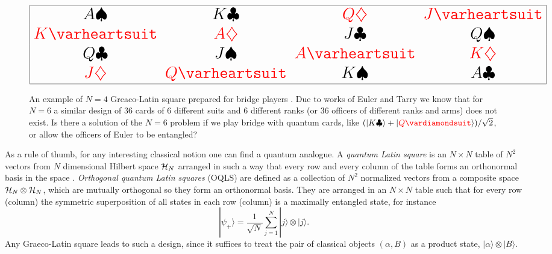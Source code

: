 \documentclass[english,aps,pra,nofootinbib,twocolumn,superscriptaddress]{revtex4-1}
\newcommand{\1}{{\rm 1\hspace{-0.9mm}l}}
\begin{document}
\begin{figure}[h]
	\centering
\begin{equation} { 
\huge
 \begin{array}{|cccc|} \hline 
{ A\spadesuit}  & K\clubsuit&  {\color{red} Q\diamondsuit }&  {\color{red} J\varheartsuit}  \\ 
{ {\color{red} K\varheartsuit}} & {\color{red} A\diamondsuit }& { J\clubsuit}& Q\spadesuit\\  
{Q\clubsuit}    & J\spadesuit  &{{\color{red}A\varheartsuit}} & {\color{red} K\diamondsuit} \\  
{\color{red} J\diamondsuit} & {\color{red} Q\varheartsuit} & K\spadesuit & A\clubsuit \\ \hline
\end{array} } 
\nonumber
 \end{equation}
	\caption{An example of $N = 4$ Greaco-Latin square prepared 
	for bridge players \cite{BP}.
Due to works of Euler and  Tarry we know that for $N=6$
a similar design of 36 cards of 6 different suits and 6 different ranks
(or 36 officers of different ranks and arms) does not exist.
Is there a solution of the  $N=6$ problem if we play bridge with quantum cards, like
 $ (|K\clubsuit \rangle + | {\color{red} Q\vardiamondsuit}\rangle)/\sqrt{2}$,
 or allow the officers of Euler to be entangled?}
 \label{fig:MOLS4}
\end{figure}

As a rule of thumb, for any interesting classical notion
one can find a quantum analogue.  
A {\sl quantum Latin square} is an $N \times N$ table of  $N^2$ vectors from 
$N$ dimensional Hilbert space ${\cal H}_N$ 
arranged in such a way that every row and every column of the table 
forms an orthonormal basis in the space \cite{MV16}.  
{\sl Orthogonal quantum Latin squares} (OQLS) are defined \cite{GRMZ18}
as  a collection  of  $N^2$  normalized vectors from a composite  space  
${\cal H}_N \otimes {\cal H}_N$,
 which are  mutually orthogonal so they form an orthonormal basis.
They are arranged in an $N \times N$ table such that for every row (column)
 the symmetric superposition of all states in each row (column) 
 is a maximally entangled state, for instance 
\begin{equation}\label{maxent}
 |\psi_+\rangle= \frac{1}{\sqrt{N}} \sum_{j=1}^N |j\rangle \otimes |j\rangle.
\end{equation}
 Any  Graeco-Latin square leads to  such a design,
 since it suffices to treat the pair of classical objects $(\alpha,  B)$ 
 as a product state, $|\alpha \rangle \otimes |B \rangle$.
\end{document}
